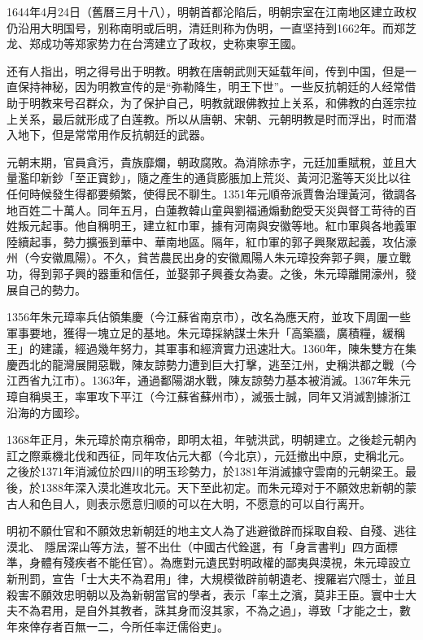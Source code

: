 1644年4月24日（舊曆三月十八），明朝首都沦陷后，明朝宗室在江南地区建立政权仍沿用大明国号，别称南明或后明，清廷則称为伪明，一直坚持到1662年。而郑芝龙、郑成功等郑家势力在台湾建立了政权，史称東寧王國。

还有人指出，明之得号出于明教。明教在唐朝武则天延载年间，传到中国，但是一直保持神秘，因为明教宣传的是“弥勒降生，明王下世”。一些反抗朝廷的人经常借助于明教来号召群众，为了保护自己，明教就跟佛教拉上关系，和佛教的白莲宗拉上关系，最后就形成了白莲教。所以从唐朝、宋朝、元朝明教是时而浮出，时而潜入地下，但是常常用作反抗朝廷的武器。

元朝末期，官員貪污，貴族靡爛，朝政腐敗。為消除赤字，元廷加重賦稅，並且大量濫印新鈔「至正寶鈔」，隨之產生的通貨膨脹加上荒災、黃河氾濫等天災比以往任何時候發生得都要頻繁，使得民不聊生。1351年元順帝派賈魯治理黃河，徵調各地百姓二十萬人。同年五月，白蓮教韓山童與劉福通煽動飽受天災與督工苛待的百姓叛元起事。他自稱明王，建立紅巾軍，據有河南與安徽等地。紅巾軍與各地義軍陸續起事，勢力擴張到華中、華南地區。隔年，紅巾軍的郭子興聚眾起義，攻佔濠州（今安徽鳳陽）。不久，貧苦農民出身的安徽鳳陽人朱元璋投奔郭子興，屢立戰功，得到郭子興的器重和信任，並娶郭子興養女為妻。之後，朱元璋離開濠州，發展自己的勢力。

1356年朱元璋率兵佔領集慶（今江蘇省南京市），改名為應天府，並攻下周圍一些軍事要地，獲得一塊立足的基地。朱元璋採納謀士朱升「高築牆，廣積糧，緩稱王」的建議，經過幾年努力，其軍事和經濟實力迅速壯大。1360年，陳朱雙方在集慶西北的龍灣展開惡戰，陳友諒勢力遭到巨大打擊，逃至江州，史稱洪都之戰（今江西省九江市）。1363年，通過鄱陽湖水戰，陳友諒勢力基本被消滅。1367年朱元璋自稱吳王，率軍攻下平江（今江蘇省蘇州市），滅張士誠，同年又消滅割據浙江沿海的方國珍。

1368年正月，朱元璋於南京稱帝，即明太祖，年號洪武，明朝建立。之後趁元朝內訌之際乘機北伐和西征，同年攻佔元大都（今北京），元廷撤出中原，史稱北元。之後於1371年消滅位於四川的明玉珍勢力，於1381年消滅據守雲南的元朝梁王。最後，於1388年深入漠北進攻北元。天下至此初定。而朱元璋对于不願效忠新朝的蒙古人和色目人，则表示愿意归顺的可以在大明，不愿意的可以自行离开。

明初不願仕官和不願效忠新朝廷的地主文人為了逃避徵辟而採取自殺、自殘、逃往漠北、 隱居深山等方法，誓不出仕（中國古代銓選，有「身言書判」四方面標準，身體有殘疾者不能任官）。為應對元遺民對明政權的鄙夷與漠視，朱元璋設立新刑罰，宣告「士大夫不為君用」律，大規模徵辟前朝遺老、搜羅岩穴隱士，並且殺害不願效忠明朝以及為新朝當官的學者，表示「率土之濱，莫非王臣。寰中士大夫不為君用，是自外其教者，誅其身而沒其家，不為之過」，導致「才能之士，數年來倖存者百無一二，今所任率迂儒俗吏」。


